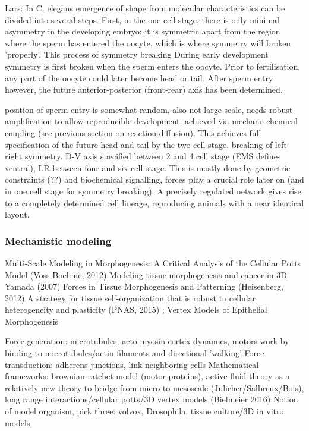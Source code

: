 \documentclass[fleqn,10pt]{wlscirep}
\begin{document}
Lars: In C. elegans emergence of shape from molecular characteristics can be divided into several steps. First, in the one cell stage, there is only minimal asymmetry in the developing embryo: it is symmetric apart from the region where the sperm has entered the oocyte, which is where symmetry will broken 'properly'. This process of symmetry breaking During early development symmetry is first broken when the sperm enters the oocyte. Prior to fertilisation, any part of the oocyte could later become head or tail. After sperm entry however, the future anterior-posterior (front-rear) axis has been determined. 

position of sperm entry is somewhat random, also not large-scale, needs robust amplification to allow reproducible development. achieved via mechano-chemical coupling (see previous section on reaction-diffusion). This achieves full specification of the future head and tail by the two cell stage. breaking of left-right symmetry. D-V axis specified between 2 and 4 cell stage (EMS defines ventral), LR between four and six cell stage. This is mostly done by geometric constraints (??) and biochemical signalling, forces play a crucial role later on (and in one cell stage for symmetry breaking). A precisely regulated network gives rise to a completely determined cell lineage, reproducing animals with a near identical layout.




\subsubsection*{Mechanistic modeling}
Multi-Scale Modeling in Morphogenesis: A Critical Analysis of the Cellular Potts Model (Voss-Boehme, 2012) \cite{voss2012multi}
Modeling tissue morphogenesis and cancer in 3D Yamada (2007) \cite{yamada2007modeling}
Forces in Tissue Morphogenesis and Patterning (Heisenberg, 2012) \cite{heisenberg2013forces}
A strategy for tissue self-organization that is robust to
cellular heterogeneity and plasticity (PNAS, 2015) \cite{cerchiari2015strategy} ;
Vertex Models of Epithelial Morphogenesis~\cite{fletcher2014vertex}

Force generation: microtubules, acto-myosin cortex dynamics, motors work by binding to microtubules/actin-filaments and directional 'walking'
Force transduction: adherens junctions, link neighboring cells
Mathematical frameworks: brownian ratchet model (motor proteins), active fluid theory as a relatively new theory to bridge from micro to mesoscale (Julicher/Salbreux/Bois), long range interactions/cellular potts/3D vertex models (Bielmeier 2016)
Notion of model organism, pick three: volvox, Drosophila, tissue culture/3D in vitro models 
\end{document}
